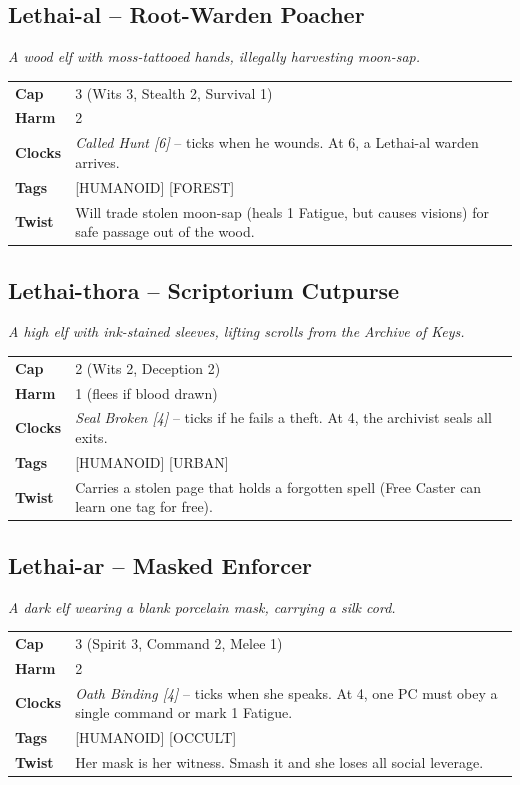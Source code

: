 \documentclass[10pt,twocolumn]{article}
\newcommand{\kw}[1]{\textbf{#1}}     %
\begin{document}
\subsection*{Lethai-al -- Root-Warden Poacher}
\textit{A wood elf with moss-tattooed hands, illegally harvesting moon-sap.}
\begin{tabular}{@{}ll}
\toprule
\kw{Cap} & 3 (Wits 3, Stealth 2, Survival 1) \\
\kw{Harm} & 2 \\
\kw{Clocks} & \textit{Called Hunt [6]} -- ticks when he wounds. At 6, a Lethai-al warden arrives. \\
\kw{Tags} & [HUMANOID] [FOREST] \\
\kw{Twist} & Will trade stolen moon-sap (heals 1 Fatigue, but causes visions) for safe passage out of the wood. \\
\bottomrule
\end{tabular}

\subsection*{Lethai-thora -- Scriptorium Cutpurse}
\textit{A high elf with ink-stained sleeves, lifting scrolls from the Archive of Keys.}
\begin{tabular}{@{}ll}
\toprule
\kw{Cap} & 2 (Wits 2, Deception 2) \\
\kw{Harm} & 1 (flees if blood drawn) \\
\kw{Clocks} & \textit{Seal Broken [4]} -- ticks if he fails a theft. At 4, the archivist seals all exits. \\
\kw{Tags} & [HUMANOID] [URBAN] \\
\kw{Twist} & Carries a stolen page that holds a forgotten spell (Free Caster can learn one tag for free). \\
\bottomrule
\end{tabular}

\subsection*{Lethai-ar -- Masked Enforcer}
\textit{A dark elf wearing a blank porcelain mask, carrying a silk cord.}
\begin{tabular}{@{}ll}
\toprule
\kw{Cap} & 3 (Spirit 3, Command 2, Melee 1) \\
\kw{Harm} & 2 \\
\kw{Clocks} & \textit{Oath Binding [4]} -- ticks when she speaks. At 4, one PC must obey a single command or mark 1 Fatigue. \\
\kw{Tags} & [HUMANOID] [OCCULT] \\
\kw{Twist} & Her mask is her witness. Smash it and she loses all social leverage. \\
\bottomrule
\end{tabular}
\end{document}
